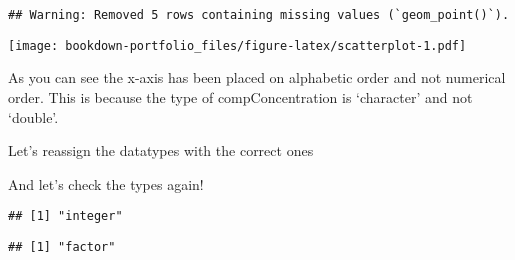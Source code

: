 \documentclass[
]{book}
\newenvironment{Shaded}{\begin{snugshade}}{\end{snugshade}}
\newcommand{\FunctionTok}[1]{\textcolor[rgb]{0.00,0.00,0.00}{#1}}
\newcommand{\NormalTok}[1]{#1}
\newcommand{\OtherTok}[1]{\textcolor[rgb]{0.56,0.35,0.01}{#1}}
\newcommand{\SpecialCharTok}[1]{\textcolor[rgb]{0.00,0.00,0.00}{#1}}
\begin{document}
\begin{verbatim}
## Warning: Removed 5 rows containing missing values (`geom_point()`).
\end{verbatim}

\texttt{[image: bookdown-portfolio\_files/figure-latex/scatterplot-1.pdf]}

As you can see the x-axis has been placed on alphabetic order and not numerical order. This is because the type of compConcentration is `character' and not `double'.

Let's reassign the datatypes with the correct ones

\begin{Shaded}
\end{Shaded}

And let's check the types again!

\begin{Shaded}
\end{Shaded}

\begin{verbatim}
## [1] "integer"
\end{verbatim}

\begin{Shaded}
\end{Shaded}

\begin{verbatim}
## [1] "factor"
\end{verbatim}

\begin{Shaded}
\end{Shaded}
\end{document}
